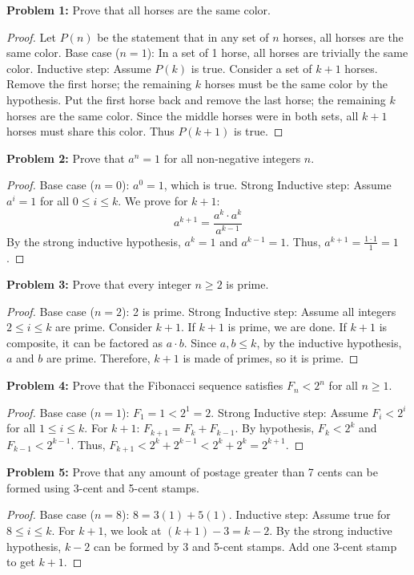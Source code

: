 \documentclass[11pt, a4paper]{article}
\theoremstyle{definition}
\theoremstyle{remark}
\begin{document}
\textbf{Problem 1:} Prove that all horses are the same color.
\begin{proof}
    Let $P(n)$ be the statement that in any set of $n$ horses, all horses are the same color.
    Base case ($n=1$): In a set of 1 horse, all horses are trivially the same color.
    Inductive step: Assume $P(k)$ is true. Consider a set of $k+1$ horses. Remove the first horse; the remaining $k$ horses must be the same color by the hypothesis. Put the first horse back and remove the last horse; the remaining $k$ horses are the same color. Since the middle horses were in both sets, all $k+1$ horses must share this color. Thus $P(k+1)$ is true.
\end{proof}

\textbf{Problem 2:} Prove that $a^n = 1$ for all non-negative integers $n$.
\begin{proof}
    Base case ($n=0$): $a^0 = 1$, which is true.
    Strong Inductive step: Assume $a^i = 1$ for all $0 \le i \le k$. We prove for $k+1$:
    \[ a^{k+1} = \frac{a^k \cdot a^k}{a^{k-1}} \]
    By the strong inductive hypothesis, $a^k = 1$ and $a^{k-1} = 1$. Thus, $a^{k+1} = \frac{1 \cdot 1}{1} = 1$.
\end{proof}

\textbf{Problem 3:} Prove that every integer $n \ge 2$ is prime.
\begin{proof}
    Base case ($n=2$): 2 is prime.
    Strong Inductive step: Assume all integers $2 \le i \le k$ are prime. Consider $k+1$. If $k+1$ is prime, we are done. If $k+1$ is composite, it can be factored as $a \cdot b$. Since $a, b \le k$, by the inductive hypothesis, $a$ and $b$ are prime. Therefore, $k+1$ is made of primes, so it is prime.
\end{proof}

\textbf{Problem 4:} Prove that the Fibonacci sequence satisfies $F_n < 2^n$ for all $n \ge 1$.
\begin{proof}
    Base case ($n=1$): $F_1 = 1 < 2^1 = 2$.
    Strong Inductive step: Assume $F_i < 2^i$ for all $1 \le i \le k$.
    For $k+1$: $F_{k+1} = F_k + F_{k-1}$.
    By hypothesis, $F_k < 2^k$ and $F_{k-1} < 2^{k-1}$.
    Thus, $F_{k+1} < 2^k + 2^{k-1} < 2^k + 2^k = 2^{k+1}$.
\end{proof}

\textbf{Problem 5:} Prove that any amount of postage greater than 7 cents can be formed using 3-cent and 5-cent stamps.
\begin{proof}
    Base case ($n=8$): $8 = 3(1) + 5(1)$.
    Inductive step: Assume true for $8 \le i \le k$. For $k+1$, we look at $(k+1) - 3 = k-2$. By the strong inductive hypothesis, $k-2$ can be formed by 3 and 5-cent stamps. Add one 3-cent stamp to get $k+1$.
\end{proof}
\end{document}
